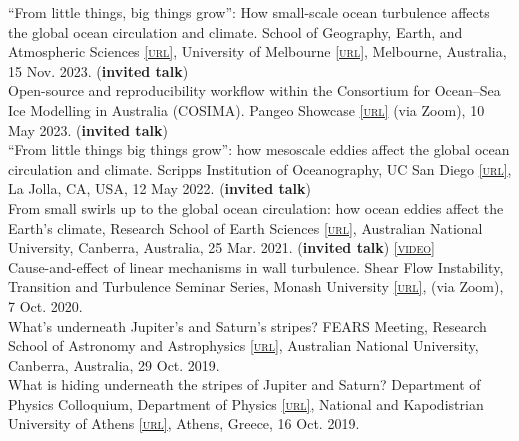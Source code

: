 \documentclass[10pt, letter]{article}
\def\www{http://www.navidconstantinou.com}
\newcommand{\html}[1]{\href{#1}{\scriptsize\textsc{[url]}}}
\newcommand{\years}[1]{\marginnote{\scriptsize #1}}
\begin{document}
``From little things, big things grow'': How small-scale ocean turbulence affects the global ocean circulation and climate. School of Geography, Earth, and Atmospheric Sciences \html{https://www.unimelb.edu.au}, University of Melbourne \html{https://sgeas.unimelb.edu.au}, Melbourne, Australia, 15 Nov. 2023. (\textbf{invited talk}) \\[.2cm]
\years{2023} Open-source and reproducibility workflow within the Consortium for Ocean--Sea Ice Modelling in Australia (COSIMA). Pangeo Showcase \html{https://pangeo.io/pangeo-showcase.html} (via Zoom), 10 May 2023. (\textbf{invited talk}) \\[.2cm]
\years{2022} “From little things big things grow”: how mesoscale eddies affect the global ocean circulation and climate. Scripps Institution of Oceanography, UC San Diego \html{https://scripps.ucsd.edu/}, La Jolla, CA, USA, 12 May 2022. (\textbf{invited talk}) \\[.2cm]
\years{2021} From small swirls up to the global ocean circulation: how ocean eddies affect the Earth’s climate, Research School of Earth Sciences \html{https://earthsciences.anu.edu.au/}, Australian National University, Canberra, Australia, 25 Mar. 2021. (\textbf{invited talk}) \href{\www/presentations/RSES-EddiesClimate_Mar2021.pdf}{{}} \href{https://www.youtube.com/watch?v=PPz8bD-vJmI&list=PLyZME1ti5Gk3RzPpheCQmtA7XUlqNT7LY&index=25}{\scriptsize\textsc{[video]}}\\[.2cm]
\years{2020} Cause-and-effect of linear mechanisms in wall turbulence. Shear Flow Instability, Transition and Turbulence Seminar Series, Monash University \html{https://www.monash.edu}, (via Zoom), 7 Oct. 2020.  \href{\www/presentations/Monash-ShearTurbulence-Oct2020.pdf}{{}}\\[.2cm]
What's underneath Jupiter's and Saturn's stripes? FEARS Meeting, Research School of Astronomy and Astrophysics \html{http://rsaa.anu.edu.au/}, Australian National University, Canberra, Australia, 29 Oct. 2019. \href{\www/presentations/RSAA-MagneticViscosity_Oct2019.pdf}{{}}\\[.2cm]
What is hiding underneath the stripes of Jupiter and Saturn? Department of Physics Colloquium, Department of Physics \html{http://en.phys.uoa.gr/}, National and Kapodistrian University of Athens \html{http://en.uoa.gr/}, Athens, Greece, 16 Oct. 2019. \href{\www/presentations/UoA-MagneticViscosity_Oct2019.pdf}{{}}\\[.2cm]
\end{document}
